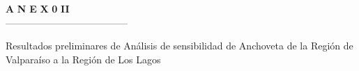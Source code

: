 \documentclass[12pt, oneside]{article} %
\begin{document}

\begingroup
\begin{titlepage}
   \normalsize
\vspace*{7cm} 

\noindent


 \begin{flushright}
 \fontsize{35pt}{35pt}\selectfont 	
 \uppercase\expandafter{}  \textbf{A} \hspace{0.2pt} \textbf{N}  \hspace{0.2pt} \textbf{E} \hspace{0.2pt}  \textbf{X} \hspace{0.2pt}   \textbf{0} \hspace{8.5pt}    \textbf{II}  \\
 \vspace*{-0.5cm} 
 --------------------------------------\\
\end{flushright} 

\vspace*{-1.5cm} 

 \begin{flushright}
  \fontsize{14pt}{14pt}\selectfont 
 Resultados preliminares de Análisis de sensibilidad de Anchoveta de la Región de Valparaíso a la Región de Los Lagos
 \end{flushright} 
      
\end{titlepage}
\endgroup
\end{document}

